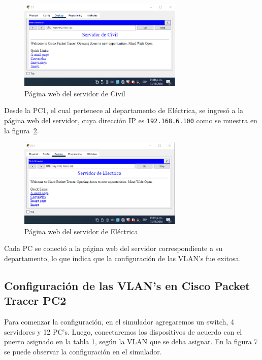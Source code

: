         \begin{figure}[H]
            \centering
            \includegraphics[width=0.7\textwidth]{img/servidor_civil_PC1.png}
            \caption{Página web del servidor de Civil}
            \label{fig:servidor_civil_PC1}
        \end{figure}

        Desde la PC1, el cual pertenece al departamento de Eléctrica, se ingresó a la página web del servidor, cuya dirección IP es \texttt{192.168.6.100} como se muestra en la figura~\ref{fig:servidor_electrica_PC1}.

        \begin{figure}[H]
            \centering
            \includegraphics[width=0.7\textwidth]{img/servidor_electrica_PC1.png}
            \caption{Página web del servidor de Eléctrica}
            \label{fig:servidor_electrica_PC1}
        \end{figure}

        Cada PC se conectó a la página web del servidor correspondiente a su departamento, lo que indica que la configuración de las VLAN's fue exitosa.

    \subsection{Configuración de las VLAN's en Cisco Packet Tracer PC2}
        Para comenzar la configuración, en el simulador agregaremos un switch, 4 servidores y 12 PC's. Luego, conectaremos los dispositivos de acuerdo con el puerto asignado en la tabla 1, según la VLAN que se deba asignar. En la figura 7 se puede observar la configuración en el simulador.

